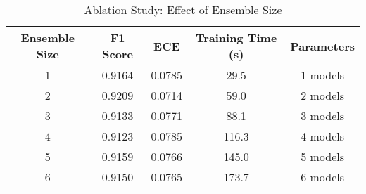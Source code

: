 \begin{table}[h]
\centering
\caption{Ablation Study: Effect of Ensemble Size}
\label{tab:ensemble_size_ablation}
\begin{tabular}{ccccc}
\hline
Ensemble Size & F1 Score & ECE & Training Time (s) & Parameters \\
\hline
1 & 0.9164 & 0.0785 & 29.5 & 1 models \\
2 & 0.9209 & 0.0714 & 59.0 & 2 models \\
3 & 0.9133 & 0.0771 & 88.1 & 3 models \\
4 & 0.9123 & 0.0785 & 116.3 & 4 models \\
5 & 0.9159 & 0.0766 & 145.0 & 5 models \\
6 & 0.9150 & 0.0765 & 173.7 & 6 models \\
\hline
\end{tabular}
\end{table}
